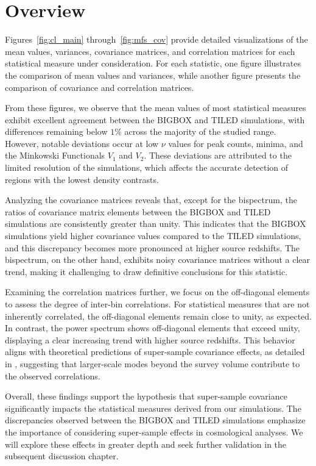 \section{Overview}
Figures~\ref{fig:cl_main} through~\ref{fig:mfs_cov} provide detailed visualizations of the mean values, variances, covariance matrices, and correlation matrices for each statistical measure under consideration. For each statistic, one figure illustrates the comparison of mean values and variances, while another figure presents the comparison of covariance and correlation matrices. 

From these figures, we observe that the mean values of most statistical measures exhibit excellent agreement between the BIGBOX and TILED simulations, with differences remaining below $1\%$ across the majority of the studied range. However, notable deviations occur at low $\nu$ values for peak counts, minima, and the Minkowski Functionals $V_1$ and $V_2$. These deviations are attributed to the limited resolution of the simulations, which affects the accurate detection of regions with the lowest density contrasts.

Analyzing the covariance matrices reveals that, except for the bispectrum, the ratios of covariance matrix elements between the BIGBOX and TILED simulations are consistently greater than unity. This indicates that the BIGBOX simulations yield higher covariance values compared to the TILED simulations, and this discrepancy becomes more pronounced at higher source redshifts. The bispectrum, on the other hand, exhibits noisy covariance matrices without a clear trend, making it challenging to draw definitive conclusions for this statistic.

Examining the correlation matrices further, we focus on the off-diagonal elements to assess the degree of inter-bin correlations. For statistical measures that are not inherently correlated, the off-diagonal elements remain close to unity, as expected. In contrast, the power spectrum shows off-diagonal elements that exceed unity, displaying a clear increasing trend with higher source redshifts. This behavior aligns with theoretical predictions of super-sample covariance effects, as detailed in \citet{PhysRevD.87.123504}, suggesting that larger-scale modes beyond the survey volume contribute to the observed correlations.

Overall, these findings support the hypothesis that super-sample covariance significantly impacts the statistical measures derived from our simulations. The discrepancies observed between the BIGBOX and TILED simulations emphasize the importance of considering super-sample effects in cosmological analyses. We will explore these effects in greater depth and seek further validation in the subsequent discussion chapter.

